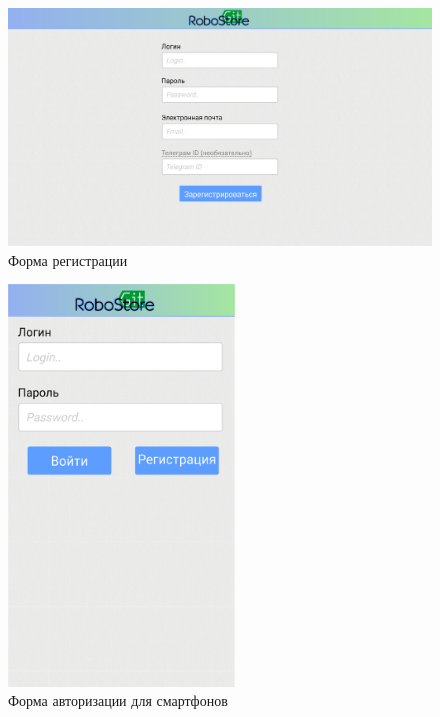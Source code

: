 \documentclass[12pt, a4paper]{article}
\begin{document}
\begin{figure}[H]
  \centering
  \includegraphics[width=16cm]{png/store_sign.png}
  \caption{Форма регистрации}
\end{figure}

\begin{figure}[H]
  \centering
  \includegraphics[width=6cm]{png/auth_smart.png}
  \caption{Форма авторизации для смартфонов}
\end{figure}
\end{document}
